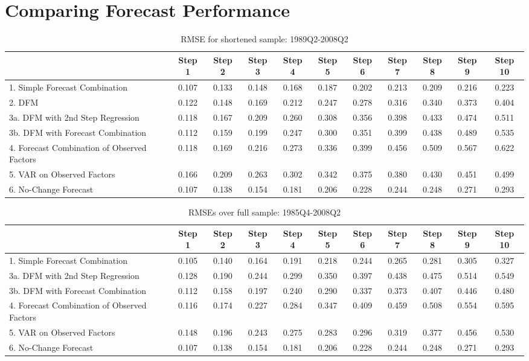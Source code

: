 \documentclass[12pt]{article}
\begin{document}
\section{\protect\normalsize Comparing Forecast Performance}

{\normalsize \clearpage
}

{\normalsize
\begin{table}
\center
\caption{RMSE for shortened sample: 1989Q2-2008Q2}
\begin{tabular}{|l|c|c|c|c|c|c|c|c|c|c|}
\hline
&Step 1 &Step 2 &Step 3 &Step 4 &Step 5 &Step 6 &Step 7 &Step 8 &Step 9 &Step 10\\
\hline
1. Simple Forecast Combination             &0.107&0.133&0.148&0.168&0.187&0.202&0.213&0.209&0.216&0.223\\
2. DFM                                     &0.122&0.148&0.169&0.212&0.247&0.278&0.316&0.340&0.373&0.404\\
3a. DFM with 2nd Step Regression           &0.118&0.167&0.209&0.260&0.308&0.356&0.398&0.433&0.474&0.511\\
3b. DFM with Forecast Combination          &0.112&0.159&0.199&0.247&0.300&0.351&0.399&0.438&0.489&0.535\\
4. Forecast Combination of Observed Factors&0.118&0.169&0.216&0.273&0.336&0.399&0.456&0.509&0.567&0.622\\
5. VAR on Observed Factors                 &0.166&0.209&0.263&0.302&0.342&0.375&0.380&0.430&0.451&0.499\\
6. No-Change Forecast                      &0.107&0.138&0.154&0.181&0.206&0.228&0.244&0.248&0.271&0.293\\
\hline
\end{tabular}
\end{table}
}


{\normalsize \clearpage
\begin{table}
\caption{RMSEs over full sample: 1985Q4-2008Q2}
\center
\begin{tabular}{|l|c|c|c|c|c|c|c|c|c|c|}
\hline
&Step 1 &Step 2 &Step 3 &Step 4 &Step 5 &Step 6 &Step 7 &Step 8 &Step 9 &Step 10\\
\hline
1. Simple Forecast Combination             &0.105&0.140&0.164&0.191&0.218&0.244&0.265&0.281&0.305&0.327\\
3a. DFM with 2nd Step Regression           &0.128&0.190&0.244&0.299&0.350&0.397&0.438&0.475&0.514&0.549\\
3b. DFM with Forecast Combination          &0.112&0.158&0.197&0.240&0.290&0.337&0.373&0.407&0.446&0.480\\
4. Forecast Combination of Observed Factors&0.116&0.174&0.227&0.284&0.347&0.409&0.459&0.508&0.554&0.595\\
5. VAR on Observed Factors                 &0.148&0.196&0.243&0.275&0.283&0.296&0.319&0.377&0.456&0.530\\
6. No-Change Forecast                      &0.107&0.138&0.154&0.181&0.206&0.228&0.244&0.248&0.271&0.293\\
\hline
\end{tabular}
\end{table}
}
\end{document}
